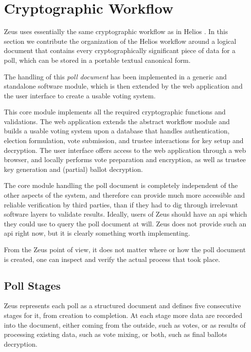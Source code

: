 \documentclass[letterpaper,10pt]{article}
\begin{document}
\section{Cryptographic Workflow}
\label{sec:crypto_workflow}

Zeus uses essentially the same cryptographic workflow as in Helios
\cite{adida:2008}.
In this section we contribute the organization of the Helios workflow
around a logical document that contains every cryptographically
significant piece of data for a poll,
which can be stored in a portable textual canonical form.

The handling of this \emph{poll document} has been implemented in a
generic and standalone software module, which is then extended by the
web application and the user interface to create a usable voting system.

This core module implements all the required cryptographic functions and
validations. The web application extends the abstract workflow module
and builds a usable voting system upon a database
that handles authentication, election formulation, vote submission,
and trustee interactions for key setup and decryption.
The user interface offers access to the web application through
a web browser, and locally performs vote preparation and encryption,
as well as trustee key generation and (partial) ballot decryption.

The core module handling the poll document is completely independent of
the other aspects of the system, and therefore can provide much more
accessible and reliable verification by third parties, than if they
had to dig through irrelevant software layers to validate results.
Ideally, users of Zeus should have an {\sc api} which they could use
to query the poll document at will. Zeus does not provide such an {\sc
  api} right now, but it is clearly something worth implementing.

From the Zeus point of view, it does not matter where or how the poll
document is created, one can inspect and verify the actual process
that took place.

\subsection{Poll Stages}
Zeus represents each poll as a structured document
and defines five consecutive stages for it, from creation to completion.
At each stage more data are recorded into the document,
either coming from the outside, such as votes,
or as results of processing existing data, such as vote mixing,
or both, such as final ballots decryption.
\end{document}

